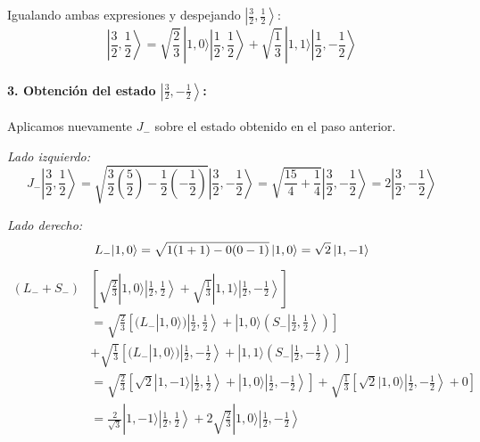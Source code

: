 \begin{problema}
Igualando ambas expresiones y despejando $\left| \frac{3}{2}, \frac{1}{2} \right\rangle$:
\begin{equation*}
\left| \frac{3}{2}, \frac{1}{2} \right\rangle = \sqrt{\frac{2}{3}} \, |1, 0\rangle \left| \frac{1}{2}, \frac{1}{2} \right\rangle + \sqrt{\frac{1}{3}} \, |1, 1\rangle \left| \frac{1}{2}, -\frac{1}{2} \right\rangle
\end{equation*}

\paragraph{3. Obtención del estado $\left| \frac{3}{2}, -\frac{1}{2} \right\rangle$:}
Aplicamos nuevamente $J_-$ sobre el estado obtenido en el paso anterior.

\textit{Lado izquierdo:}
\begin{equation*}
J_- \left| \frac{3}{2}, \frac{1}{2} \right\rangle = \sqrt{\frac{3}{2}\left(\frac{5}{2}\right) - \frac{1}{2}\left(-\frac{1}{2}\right)} \left| \frac{3}{2}, -\frac{1}{2} \right\rangle = \sqrt{\frac{15}{4} + \frac{1}{4}} \left| \frac{3}{2}, -\frac{1}{2} \right\rangle = 2 \left| \frac{3}{2}, -\frac{1}{2} \right\rangle
\end{equation*}

\textit{Lado derecho:}
\[
L_- |1, 0\rangle = \sqrt{1(1+1) - 0(0-1)} \, |1, 0\rangle = \sqrt{2} \, |1, -1\rangle \\[8pt]
\]
\begin{align*}
(L_- + S_-) &\left[ \sqrt{\frac{2}{3}} |1, 0\rangle \left| \frac{1}{2}, \frac{1}{2} \right\rangle + \sqrt{\frac{1}{3}} |1, 1\rangle \left| \frac{1}{2}, -\frac{1}{2} \right\rangle \right] \nonumber \\
&= \sqrt{\frac{2}{3}} \left[ (L_- |1, 0\rangle) \left| \frac{1}{2}, \frac{1}{2} \right\rangle + |1, 0\rangle \left( S_- \left| \frac{1}{2}, \frac{1}{2} \right\rangle \right) \right] \\
&+ \sqrt{\frac{1}{3}} \left[ (L_- |1, 0\rangle)\left| \frac{1}{2}, -\frac{1}{2} \right\rangle + |1,1\rangle \left( S_- \left| \frac{1}{2}, -\frac{1}{2} \right\rangle \right)\right] \nonumber \\
&= \sqrt{\frac{2}{3}} \left[ \sqrt{2} |1, -1\rangle \left| \frac{1}{2}, \frac{1}{2} \right\rangle + |1, 0\rangle \left| \frac{1}{2}, -\frac{1}{2} \right\rangle \right] + \sqrt{\frac{1}{3}} \left[ \sqrt{2} |1, 0\rangle \left| \frac{1}{2}, -\frac{1}{2} \right\rangle + 0 \right] \nonumber \\
&= \frac{2}{\sqrt{3}} |1, -1\rangle \left| \frac{1}{2}, \frac{1}{2} \right\rangle + 2 \sqrt{\frac{2}{3}} |1, 0\rangle \left| \frac{1}{2}, -\frac{1}{2} \right\rangle
\end{align*}


\end{problema}
